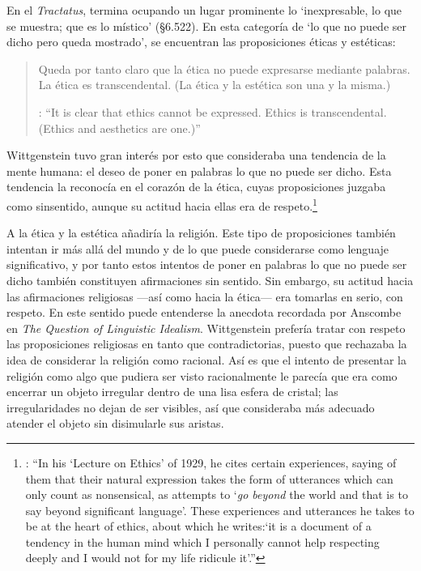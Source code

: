   En el \emph{Tractatus}, termina ocupando un lugar prominente lo \enquote*{inexpresable, lo que se muestra; que es lo místico} (\S6.522). En esta categoría de `lo que no puede ser dicho pero queda mostrado', se encuentran las proposiciones éticas y estéticas: \blockquote[{\cite[\S6.421]{wittgenstein1922tractatus}}: \enquote{It is clear that ethics cannot be expressed. Ethics is transcendental. (Ethics and aesthetics are one.)}]{Queda por tanto claro que la ética no puede expresarse mediante palabras. La ética es transcendental. (La ética y la estética son una y la misma.)}. Wittgenstein tuvo gran interés por esto que consideraba una tendencia de la mente humana: el deseo de poner en palabras lo que no puede ser dicho. Esta tendencia la reconocía en el corazón de la ética, cuyas proposiciones juzgaba como sinsentido, aunque su actitud hacia ellas era de respeto.\footnote{\cite[Cf.~][211]{teichmann2008ans}: \enquote{In his `Lecture on Ethics' of 1929, he cites certain experiences, saying of them that their natural expression takes the form of utterances which can only count as nonsensical, as attempts to `\emph{go beyond} the world and that is to say beyond significant language'. These experiences and utterances he takes to be at the heart of ethics, about which he writes:`it is a document of a tendency in the human mind which I personally cannot help respecting deeply and I would not for my life ridicule it'.}}

  A la ética y la estética añadiría la religión. Este tipo de proposiciones también intentan ir más allá del mundo y de lo que puede considerarse como lenguaje significativo, y por tanto estos intentos de poner en palabras lo que no puede ser dicho también constituyen afirmaciones sin sentido. Sin embargo, su actitud hacia las afirmaciones religiosas ---así como hacia la ética--- era tomarlas en serio, con respeto. En este sentido puede entenderse la anecdota recordada por Anscombe en \emph{The Question of Linguistic Idealism}. Wittgenstein prefería tratar con respeto las proposiciones religiosas en tanto que contradictorias, puesto que rechazaba la idea de considerar la religión como racional. Así es que el intento de presentar la religión como algo que pudiera ser visto racionalmente le parecía que era como encerrar un objeto irregular dentro de una lisa esfera de cristal; las irregularidades no dejan de ser visibles, así que consideraba más adecuado atender el objeto sin disimularle sus aristas.

